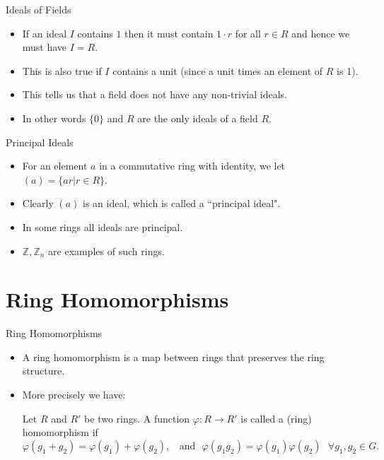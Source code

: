 \documentclass[ %
 10pt, xcolor={dvipsnames,svgnames,x11names,hyperref},
   hyperref={colorlinks=true,citecolor=green,linkcolor=DarkRed,urlcolor=ProcessBlue,anchorcolor=blue}
  ]{beamer}
\newenvironment{stepitemize}{\begin{itemize}[<+->]}{\end{itemize} }
\newcommand{\Z}{\mathbb{Z}}
\begin{document}
\begin{frame}{Ideals of Fields}
    \begin{stepitemize}
    \item If an ideal $I$ contains $1$ then it must contain $1\cdot r$ for all $r\in R$ and hence we must have $I=R$. 
    \item This is also true if $I$ contains a unit (since a unit times an element of $R$ is 1). 
    \item This tells us that a field does not have any non-trivial ideals. 
    \item In other words $\{0\}$ and $R$ are the only ideals of a field $R$. 
    \end{stepitemize}
\end{frame}
\begin{frame}{Principal Ideals}
\begin{stepitemize}
\item For an element $a$ in a commutative ring with identity, we let 
$(a) = \{ar|r\in R\}$.
\item Clearly $(a)$ is an ideal, which is called a ``principal ideal".
\item In some rings all ideals are principal. 
\item $\Z, \Z_n$ are examples of such rings. 
\end{stepitemize}
\end{frame}

\section{Ring Homomorphisms}
\begin{frame}{Ring Homomorphisms}
    \begin{stepitemize}
    \item A ring homomorphism is a map between rings that preserves the ring structure.
    \item More precisely we have:
\begin{definition}
Let $R$ and $R'$ be two rings. A function $\varphi:R\rightarrow R'$ is called a (ring) homomorphism if 
$$\varphi(g_1+g_2) = \varphi(g_1)+\varphi(g_2), \:\:\:\:\textrm{and}\:\:\: \varphi(g_1g_2) = \varphi(g_1)\varphi(g_2) \:\:\: \forall g_1, g_2 \in G.$$
\end{definition}
\end{stepitemize}
\end{frame}
\end{document}
